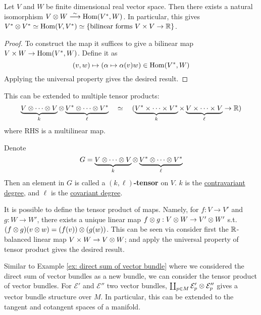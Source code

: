 \documentclass{article}
\begin{document}
\begin{proposition}
    Let $V$ and $W$ be finite dimensional real vector space. Then there exists a natural isomorphism $V \otimes W \overset{\sim}{\longrightarrow} \mathrm{Hom}(V^{\ast}, W)$. In particular, this gives $V^{\ast} \otimes V^{\ast} \simeq \mathrm{Hom}(V, V^{\ast}) \simeq \{\text{bilinear forms } V \times V \to \mathbb{R}\}$.
\end{proposition}

\begin{proof}
    To construct the map it suffices to give a bilinear map $V \times W \to \mathrm{Hom}(V^{\ast}, W)$. Define it as
    \[
        (v, w) \mapsto (\alpha \mapsto \alpha(v) w) \in \mathrm{Hom}(V^{\ast}, W)
    \]
    Applying the universal property gives the desired result. 
\end{proof}

\begin{remark}\label{rmk: tensor isomorphic to multilinear maps}
    This can be extended to multiple tensor products: 
    \[
        \underbrace{V \otimes \cdots \otimes V}_{k} \otimes \underbrace{V^{\ast} \otimes \cdots \otimes V^{\ast}}_{\ell} \quad \simeq \quad (\underbrace{V^{\ast} \times \cdots \times V^{\ast}}_{k} \times \underbrace{V \times \cdots \times V}_{\ell} \to \mathbb{R}) 
    \]
    where RHS is a multilinear map. 
\end{remark}

\begin{definition}[Tensor]
    Denote
    \[
        G = \underbrace{V \otimes \cdots \otimes V}_{k} \otimes \underbrace{V^{\ast} \otimes \cdots \otimes V^{\ast}}_{\ell}
    \]
    Then an element in $G$ is called a \textbf{$(k, \ell)$-tensor} on $V$. $k$ is the \underline{contravariant degree}, and $\ell$ is the \underline{covariant degree}.
\end{definition}

\begin{remark}
    It is possible to define the tensor product of maps. Namely, for $f: V \to V'$ and $g: W \to W'$, there exists a unique linear map $f \otimes g: V \otimes W \to V' \otimes W'$ s.t. $(f \otimes g) (v \otimes w) = (f(v)) \otimes (g(w))$. This can be seen via consider first the $\mathbb{R}$-balanced linear map $V \times W \to V \otimes W$; and apply the universal property of tensor product gives the desired result. 
\end{remark}

\begin{observation}
    Similar to Example \ref{ex: direct sum of vector bundle} where we considered the direct sum of vector bundles as a new bundle, we can consider the tensor product of vector bundles. For $\mathcal{E}'$ and $\mathcal{E}''$ two vector bundles, $\coprod_{p \in M} \mathcal{E}_p' \otimes \mathcal{E}_p''$ gives a vector bundle structure over $M$. In particular, this can be extended to the tangent and cotangent spaces of a manifold.
\end{observation}
\end{document}

